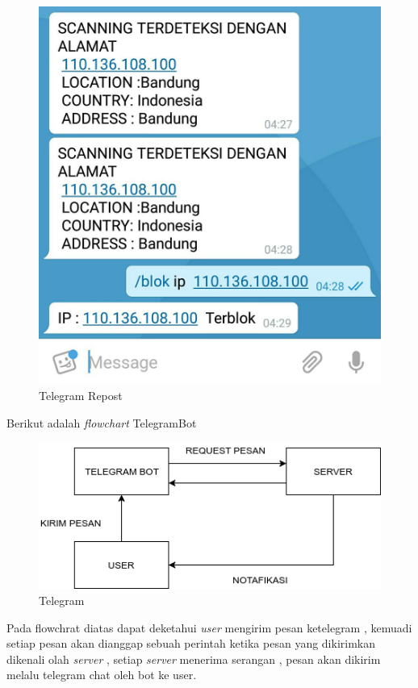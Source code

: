  
  \begin{figure}[H]
 	\centering
 	\includegraphics[scale = 0.15 ]{gambar/telegram_bot}
 	\caption{Telegram Repost}
 	\label{Telegram Repost}
 \end{figure}
 
  Berikut adalah \emph{flowchart} TelegramBot

 \begin{figure}[H]
	\centering
	\includegraphics[scale = 0.7 ]{gambar/TELEGRAM}
	\caption{Telegram}
	\label{Telegram}
\end{figure}

Pada flowchrat diatas dapat deketahui \emph{user} mengirim pesan ketelegram , kemuadi setiap pesan akan dianggap sebuah perintah ketika pesan yang dikirimkan dikenali olah \emph{server} , setiap \emph{server} menerima serangan , pesan akan dikirim melalu telegram chat oleh bot ke user.
